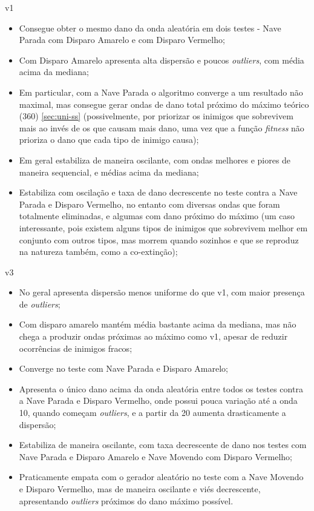 v1
\begin{itemize}
  \item Consegue obter o mesmo dano da onda aleatória em dois testes - Nave Parada com Disparo Amarelo e com Disparo Vermelho;
  \item Com Disparo Amarelo apresenta alta dispersão e poucos \textit{outliers}, com média acima da mediana;
  \item Em particular, com a Nave Parada o algoritmo converge a um resultado não maximal, mas consegue gerar ondas de dano total próximo do máximo teórico (360) \ref{sec:uni-ss} (possivelmente, por priorizar os inimigos que sobrevivem mais ao invés de os que causam mais dano, uma vez que a função \textit{fitness} não prioriza o dano que cada tipo de inimigo causa);
  \item Em geral estabiliza de maneira oscilante, com ondas melhores e piores de maneira sequencial, e médias acima da mediana;
  \item Estabiliza com oscilação e taxa de dano decrescente no teste contra a Nave Parada e Disparo Vermelho, no entanto com diversas ondas que foram totalmente eliminadas, e algumas com dano próximo do máximo (um caso interessante, pois existem alguns tipos de inimigos que sobrevivem melhor em conjunto com outros tipos, mas morrem quando sozinhos e que se reproduz na natureza também, como a co-extinção);
\end{itemize}

\pagebreak

v3
\begin{itemize}
  \item No geral apresenta dispersão menos uniforme do que v1, com maior presença de \textit{outliers};
  \item Com disparo amarelo mantém média bastante acima da mediana, mas não chega a produzir ondas próximas ao máximo como v1, apesar de reduzir ocorrências de inimigos fracos;
  \item Converge no teste com Nave Parada e Disparo Amarelo;
  \item Apresenta o único dano acima da onda aleatória entre todos os testes contra a Nave Parada e Disparo Vermelho, onde possui pouca variação até a onda 10, quando começam \textit{outliers}, e a partir da 20 aumenta drasticamente a dispersão;
  \item Estabiliza de maneira oscilante, com taxa decrescente de dano nos testes com Nave Parada e Disparo Amarelo e Nave Movendo com Disparo Vermelho;
  \item Praticamente empata com o gerador aleatório no teste com a Nave Movendo e Disparo Vermelho, mas de maneira oscilante e viés decrescente, apresentando \textit{outliers} próximos do dano máximo possível.
\end{itemize}

